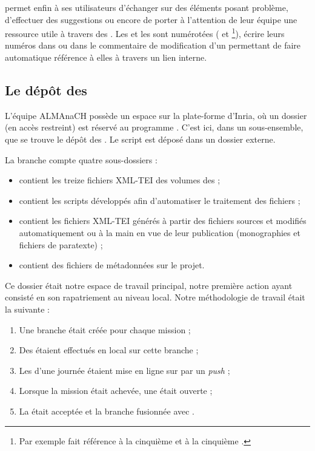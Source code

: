\gitlab{} permet enfin à ses utilisateurs d'échanger sur des éléments posant problème, d'effectuer des suggestions ou encore de porter à l'attention de leur équipe une ressource utile à travers des \issues. Les \issues{} et les \mergerequests{} sont numérotées ( et \footnote{Par exemple  fait référence à la cinquième \issue{} et  à la cinquième \mergerequest{}.}), écrire leurs numéros dans \gitlab{} ou dans le commentaire de modification d'un \commit{} permettant de faire automatique référence à elles à travers un lien interne.

\subsection{Le dépôt \gitlab{} des \odm}

L'équipe ALMAnaCH possède un espace sur la plate-forme \gitlab{} d'Inria, où un dossier (en accès restreint) est réservé au programme \timeus{}. C'est ici, dans un sous-ensemble, que se trouve le dépôt des \odm. Le script \lse{} est déposé dans un dossier externe.

La branche \master{} compte quatre sous-dossiers :

\begin{itemize}
    \item {} contient les treize fichiers XML-TEI des volumes des \odm{} ;
    \item {} contient les scripts développés afin d'automatiser le traitement des fichiers ;
    \item {} contient les fichiers XML-TEI générés à partir des fichiers sources et modifiés automatiquement ou à la main en vue de leur publication (monographies et fichiers de paratexte) ;
    \item {} contient des fichiers de métadonnées sur le projet.
\end{itemize}

Ce dossier était notre espace de travail principal, notre première action ayant consisté en son rapatriement au niveau local. Notre méthodologie de travail était la suivante :

\begin{enumerate}
    \item Une branche était créée pour chaque mission ;
    \item Des \commits{} étaient effectués en local sur cette branche ;
    \item Les \commits{} d'une journée étaient mise en ligne sur \gitlab{} par un \textit{push} ;
    \item Lorsque la mission était achevée, une \mergerequest{} était ouverte ;
    \item La \mergerequest{} était acceptée et la branche fusionnée avec \master.
\end{enumerate}


